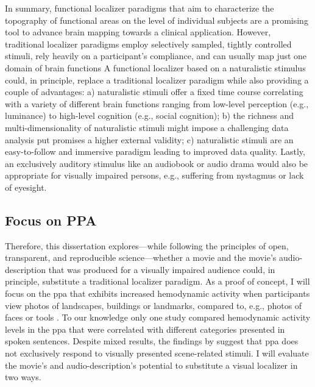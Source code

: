 In summary, functional localizer paradigms that aim to characterize the
topography of functional areas on the level of individual subjects are a
promising tool to advance brain mapping towards a clinical application.
However, traditional localizer paradigms employ selectively sampled, tightly
controlled stimuli, rely heavily on a participant's compliance, and can usually
map just one domain of brain functions
A functional localizer based on a naturalistic stimulus could, in principle,
replace a traditional localizer paradigm while also providing a couple of
advantages:
a) naturalistic stimuli offer a fixed time course correlating with a variety of
different brain functions ranging from low-level perception (e.g., luminance) to
high-level cognition (e.g., social cognition);
b) the richness and multi-dimensionality of naturalistic stimuli might impose a
challenging data analysis put promises a higher external validity;
c) naturalistic stimuli are an easy-to-follow and immersive paradigm leading to
improved data quality.
Lastly, an exclusively auditory stimulus like an audiobook or audio drama would
also be appropriate for visually impaired persons, e.g., suffering from
nystagmus or lack of eyesight.


\subsection{Focus on PPA}



Therefore, this dissertation explores---while following the principles of
open, transparent, and reproducible science---whether a movie and the movie's
audio-description that was produced for a visually impaired audience could, in
principle, substitute a traditional localizer paradigm.
As a proof of concept, I will focus on the \ac{ppa} that exhibits increased
hemodynamic activity when participants view photos of landscapes, buildings or
landmarks, compared to, e.g., photos of faces or tools \citep[e.g.,][for
reviews]{epstein2014neural, aminoff2013role}.
To our knowledge only one study \citep[cf.][]{aziz2008modulation} compared
hemodynamic activity levels in the \ac{ppa} that were correlated with different
categories presented in spoken sentences.
%
Despite mixed results, the findings by \citet{aziz2008modulation} suggest that
\ac{ppa} does not exclusively respond to visually presented scene-related
stimuli.
%
I will evaluate the movie's and audio-description's potential to substitute a
visual localizer in two ways.

